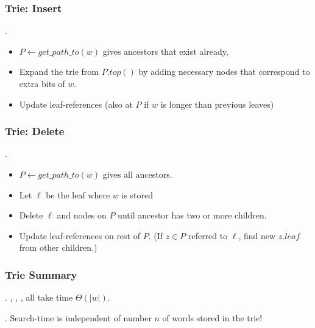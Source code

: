 \documentclass{article}
\begin{document}
\subsubsection{Trie: Insert} 

\begin{algo}[].
    \begin{itemize}
        \item $P \leftarrow get\_path\_to(w)$ gives ancestors that exist already, 
        \item Expand the trie from $P.top()$ by adding necessary nodes that correspond to extra bits of $w$. 
        \item Update leaf-references (also at $P$ if $w$ is longer than previous leaves)
    \end{itemize}
\end{algo}

\subsubsection{Trie: Delete} 

\begin{algo}[].
    \begin{itemize}
        \item $P \leftarrow get\_path\_to(w)$ gives all ancestors. 
        \item Let $\ell$ be the leaf where $w$ is stored 
        \item Delete $\ell$ and nodes on $P$ until ancestor has two or more children. 
        \item Update leaf-references on rest of $P$. (If $z \in P$ referred to $\ell$, find new $z.leaf$ from other children.)
    \end{itemize}
\end{algo}

\subsubsection{Trie Summary} 

\begin{discovery}[].
    , , ,  all take time $\Theta (|w|)$. 
\end{discovery}

\begin{comm}[].
    Search-time is independent of number $n$ of words stored in the trie!
\end{comm}
\end{document}
